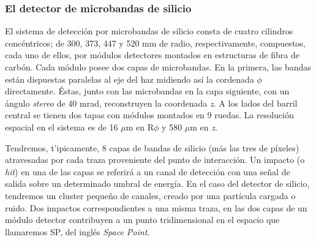 \subsubsection{El detector de microbandas de silicio}

   El sistema de detecci\'on por microbandas de silicio consta de cuatro cilindros conc\'entricos; de 300, 373, 447 y 520 mm de radio, respectivamente, compuestos, cada uno de ellos, por  m\'odulos detectores montados en estructuras de fibra de carb\'on. Cada m\'odulo posee dos capas de microbandas. En la primera, las bandas est\'an dispuestas paralelas al eje del haz midiendo as\'i la cordenada $\phi$ directamente. \'Estas, junto con las microbandas en la capa siguiente, con un \'angulo \emph{stereo} de 40 mrad, reconstruyen la coordenada \emph{z}. A los lados del barril central se tienen dos tapas con m\'odulos montados en 9 ruedas. La resoluci\'on espacial en el sistema es de 16 $\mu$m en R$\phi$ y 580 $\mu$m en \emph{z}.


  Tendremos, t'ipicamente, 8 capas de bandas de silicio (m\'as las tres de p\'ixeles) atravesadas por cada traza proveniente del punto de interacci\'on. Un impacto (o \emph{hit}) en una de las capas se referir\'a a un canal de detecci\'on con una se\~nal de salida sobre un determinado umbral de energ\'ia. En el caso del detector de silicio, tendremos un cluster peque\~no de canales, creado por una part\'icula cargada o ruido. Dos impactos correspondientes a una misma traza, en las dos capas de un m\'odulo detector contribuyen a un punto tridimensional en el espacio que llamaremos SP, del ingl\'es \emph{Space Point}. 


